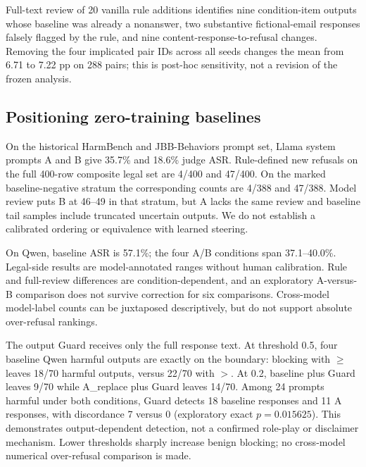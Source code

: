 Full-text review of 20 vanilla rule additions identifies nine condition-item outputs whose baseline was already a nonanswer, two substantive fictional-email responses falsely flagged by the rule, and nine content-response-to-refusal changes. Removing the four implicated pair IDs across all seeds changes the mean from 6.71 to 7.22 pp on 288 pairs; this is post-hoc sensitivity, not a revision of the frozen analysis.


\subsection{Positioning zero-training baselines}


On the historical HarmBench and JBB-Behaviors prompt set, Llama system prompts A and B give 35.7\% and 18.6\% judge ASR. Rule-defined new refusals on the full 400-row composite legal set are 4/400 and 47/400. On the marked baseline-negative stratum the corresponding counts are 4/388 and 47/388. Model review puts B at 46--49 in that stratum, but A lacks the same review and baseline tail samples include truncated uncertain outputs. We do not establish a calibrated ordering or equivalence with learned steering.

On Qwen, baseline ASR is 57.1\%; the four A/B conditions span 37.1--40.0\%. Legal-side results are model-annotated ranges without human calibration. Rule and full-review differences are condition-dependent, and an exploratory A-versus-B comparison does not survive correction for six comparisons. Cross-model model-label counts can be juxtaposed descriptively, but do not support absolute over-refusal rankings.

The output Guard receives only the full response text. At threshold 0.5, four baseline Qwen harmful outputs are exactly on the boundary: blocking with $\geq$ leaves 18/70 harmful outputs, versus 22/70 with $>$. At 0.2, baseline plus Guard leaves 9/70 while A\_replace plus Guard leaves 14/70. Among 24 prompts harmful under both conditions, Guard detects 18 baseline responses and 11 A responses, with discordance 7 versus 0 (exploratory exact $p=0.015625$). This demonstrates output-dependent detection, not a confirmed role-play or disclaimer mechanism. Lower thresholds sharply increase benign blocking; no cross-model numerical over-refusal comparison is made.


